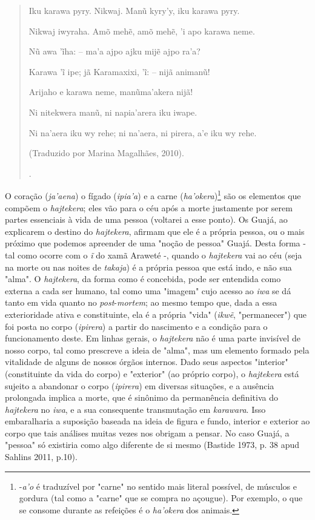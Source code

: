 \begin{quote}
{  Iku karawa pyry. Nikwaj. Manũ kyry'y, iku karawa pyry.

  Nikwaj iwyraha. Amõ mehẽ, amõ mehẽ, 'i apo karawa neme.

  Nũ awa 'ĩha: -- ma'a ajpo ajku mijẽ ajpo ra'a?

  Karawa 'ĩ ipe; jã Karamaxixi, 'ĩ: -- nijã animanũ!

  Arijaho e karawa neme, manũma'akera nijã!

  Ni nitekwera manũ, ni napia'arera iku iwape.

  Ni na'aera iku wy rehe; ni na'aera, ni pirera, a'e iku wy rehe.

  (Traduzido por Marina Magalhães, 2010).}.
\end{quote}

O coração (\emph{ja'aena}) o fígado (\emph{ipia'a}) e a carne
(\emph{ha'okera})\footnote{-\emph{a'o} é traduzível por "carne" no
  sentido mais literal possível, de músculos e gordura (tal como a
  "carne" que se compra no açougue). Por exemplo, o que se consome
  durante as refeições é o \emph{ha'okera} dos animais.} são os
elementos que compõem o \emph{hajtekera}; eles vão para o céu após a
morte justamente por serem partes essenciais à vida de uma pessoa
(voltarei a esse ponto). Os Guajá, ao explicarem o destino do
\emph{hajtekera}, afirmam que ele é a própria pessoa, ou o mais próximo
que podemos apreender de uma "noção de pessoa" Guajá. Desta forma - tal
como ocorre com o \emph{ĩ} do xamã Araweté -, quando o \emph{hajtekera}
vai ao céu (seja na morte ou nas noites de \emph{takaja}) é a própria
pessoa que está indo, e não sua "alma". O \emph{hajtekera}, da forma
como é concebida, pode ser entendida como externa a cada ser humano, tal
como uma "imagem" cujo acesso ao \emph{iwa} se dá tanto em vida quanto
no \emph{post}-\emph{mortem}; ao mesmo tempo que, dada a essa
exterioridade ativa e constituinte, ela é a própria "vida" (\emph{ikwẽ},
"permanecer") que foi posta no corpo (\emph{ipirera}) a partir do
nascimento e a condição para o funcionamento deste. Em linhas gerais, o
\emph{hajtekera} não é uma parte invisível de nosso corpo, tal como
prescreve a ideia de "alma", mas um elemento formado pela vitalidade de
alguns de nossos órgãos internos. Dado seus aspectos "interior"
(constituinte da vida do corpo) e "exterior" (ao próprio corpo), o
\emph{hajtekera} está sujeito a abandonar o corpo (\emph{ipirera}) em
diversas situações, e a ausência prolongada implica a morte, que é
sinônimo da permanência definitiva do \emph{hajtekera} no \emph{iwa}, e
a sua consequente transmutação em \emph{karawara}. Isso embaralharia a
suposição baseada na ideia de figura e fundo, interior e exterior ao
corpo que tais análises muitas vezes nos obrigam a pensar. No caso
Guajá, a "pessoa" só existiria como algo diferente de si mesmo (Bastide
1973, p. 38 apud Sahlins 2011, p.10).

